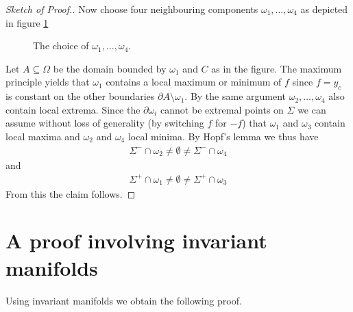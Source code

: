 \begin{proof}[Sketch of Proof.]
  Now choose four neighbouring components $\omega_1,\dots,\omega_4$ as depicted in figure \ref{fi:n2:levelSets:neighbouringComponents}
  \begin{figure}
    \centering
    
    \caption{The choice of $\omega_1,\dots,\omega_4$.}
    \label{fi:n2:levelSets:neighbouringComponents}
  \end{figure}
  Let $A\subseteq\Omega$ be the domain bounded
  by $\omega_1$ and $C$ as in the figure. The maximum principle yields that $\omega_1$ contains a local maximum or minimum of $f$ since
  $f=y_c$ is constant on the other boundaries $\partial A\setminus\omega_1$.
  By the same argument $\omega_2,\dots,\omega_4$ also contain local extrema. 
  Since the $\partial\omega_i$ cannot be extremal points on $\Sigma$
  we can assume without loss of generality (by switching $f$ for $-f$) that $\omega_1$ and $\omega_3$ contain local maxima and $\omega_2 $ and $\omega_4$ local
  minima. By Hopf's lemma we thus have
  \begin{align*}
    \Sigma^-\cap\omega_2\neq\emptyset\neq\Sigma^-\cap\omega_4
  \end{align*}
  and 
  \begin{align*}
    \Sigma^+\cap\omega_1\neq\emptyset\neq\Sigma^+\cap\omega_3
  \end{align*}
  From this the claim follows.
\end{proof}

\section{A proof involving invariant manifolds}

Using invariant manifolds we obtain the following proof.

